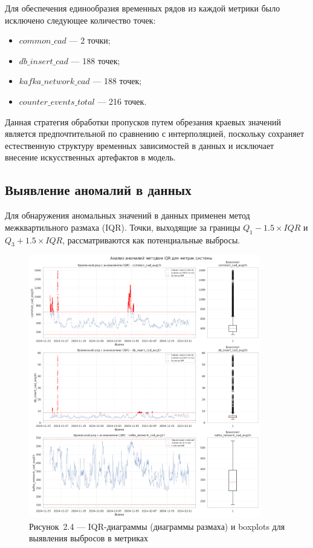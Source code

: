\hspace*{1.25cm}Для обеспечения единообразия временных рядов из каждой метрики было исключено следующее количество точек:

\begin{itemize}
	\item $common\_cad$ --- 2 точки;
	\item $db\_insert\_cad$ --- 188 точек;
	\item $kafka\_network\_cad$ --- 188 точек;
	\item $counter\_events\_total$ --- 216 точек.
\end{itemize}

\hspace*{1.25cm}Данная стратегия обработки пропусков путем обрезания краевых значений является предпочтительной по сравнению с интерполяцией, поскольку сохраняет естественную структуру временных зависимостей в данных и исключает внесение искусственных артефактов в модель.

\subsection{Выявление аномалий в данных}

\hspace*{1.25cm}Для обнаружения аномальных значений в данных применен метод межквартильного размаха (IQR). Точки, выходящие за границы $Q_1 - 1.5 \times IQR$ и $Q_3 + 1.5 \times IQR$, рассматриваются как потенциальные выбросы.

\begin{figure}[H]
	\centering
	\includegraphics[width=0.9\textwidth]{figures/chapter2/outliers_boxplot.png}
	\caption*{Рисунок~2.4 --- IQR-диаграммы (диаграммы размаха) и boxplots для выявления выбросов в метриках}
	\label{fig:outliers_analysis}
\end{figure}

